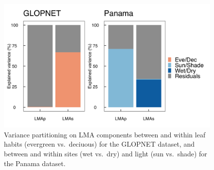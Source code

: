 \documentclass[
  12pt,
  a4paper,
,tablecaptionabove
]{scrartcl}
\providecommand{\DIFaddbeginFL}{} %
\providecommand{\DIFaddendFL}{} %
\providecommand{\DIFdelbeginFL}{} %
\providecommand{\DIFdelendFL}{} %
\newcommand{\DIFscaledelfig}{0.5}
\newlength{\DIFdelgraphicswidth} %
\newlength{\DIFdelgraphicsheight} %
\newcommand{\DIFaddincludegraphics}[2][]{{\color{blue}\fbox{\DIFOincludegraphics[#1]{#2}}}} %
\newcommand{\DIFdelincludegraphics}[2][]{%
\sbox{\DIFdelgraphicsbox}{\DIFOincludegraphics[#1]{#2}}%
\settoboxwidth{\DIFdelgraphicswidth}{\DIFdelgraphicsbox} %
\settoboxtotalheight{\DIFdelgraphicsheight}{\DIFdelgraphicsbox} %
\scalebox{\DIFscaledelfig}{%
\parbox[b]{\DIFdelgraphicswidth}{\usebox{\DIFdelgraphicsbox}\\[-\baselineskip] \rule{\DIFdelgraphicswidth}{0em}}\llap{\resizebox{\DIFdelgraphicswidth}{\DIFdelgraphicsheight}{%
\setlength{\unitlength}{\DIFdelgraphicswidth}%
\begin{picture}(1,1)%
\thicklines\linethickness{2pt} %
{\color[rgb]{1,0,0}\put(0,0){\framebox(1,1){}}}%
{\color[rgb]{1,0,0}\put(0,0){\line( 1,1){1}}}%
{\color[rgb]{1,0,0}\put(0,1){\line(1,-1){1}}}%
\end{picture}%
}\hspace*{3pt}}} %
} %
\DeclareRobustCommand{\DIFaddbeginFL}{\DIFOaddbeginFL \let\includegraphics\DIFaddincludegraphics} %
\DeclareRobustCommand{\DIFaddendFL}{\DIFOaddendFL \let\includegraphics\DIFOincludegraphics} %
\DeclareRobustCommand{\DIFdelbeginFL}{\DIFOdelbeginFL \let\includegraphics\DIFdelincludegraphics} %
\DeclareRobustCommand{\DIFdelendFL}{\DIFOaddendFL \let\includegraphics\DIFOincludegraphics} %
\begin{document}
\begin{figure}
\DIFdelbeginFL %
\DIFdelendFL \DIFaddbeginFL \hypertarget{fig:vpart}{%
\centering
\includegraphics{../figs/vpart.png}
\caption{Variance partitioning on LMA components between and within leaf habits (evergreen vs.~deciuous) for the GLOPNET dataset, and between and within sites (wet vs.~dry) and light (sun vs.~shade) for the Panama dataset.}\label{fig:vpart}
}
\DIFaddendFL \end{figure}

\newpage
\end{document}
